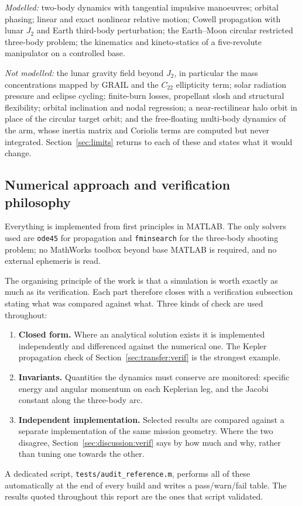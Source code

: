 \emph{Modelled:} two-body dynamics with tangential impulsive manoeuvres; orbital
phasing; linear and exact nonlinear relative motion; Cowell propagation with
lunar $J_2$ and Earth third-body perturbation; the Earth--Moon circular
restricted three-body problem; the kinematics and kineto-statics of a
five-revolute manipulator on a controlled base.

\emph{Not modelled:} the lunar gravity field beyond $J_2$, in particular the
mass concentrations mapped by GRAIL \cite{zuber_grail} and the $C_{22}$
ellipticity term; solar radiation pressure and eclipse cycling; finite-burn
losses, propellant slosh and structural flexibility; orbital inclination and
nodal regression; a near-rectilinear halo orbit in place of the circular target
orbit; and the free-floating multi-body dynamics of the arm, whose inertia
matrix and Coriolis terms are computed but never integrated. Section~\ref{sec:limits}
returns to each of these and states what it would change.

\subsection{Numerical approach and verification philosophy}

Everything is implemented from first principles in MATLAB. The only solvers used
are \texttt{ode45} for propagation and \texttt{fminsearch} for the three-body
shooting problem; no MathWorks toolbox beyond base MATLAB is required, and no
external ephemeris is read.

The organising principle of the work is that a simulation is worth exactly as
much as its verification. Each part therefore closes with a verification
subsection stating what was compared against what. Three kinds of check are used
throughout:

\begin{enumerate}[label=(\roman*)]
\item \textbf{Closed form.} Where an analytical solution exists it is
      implemented independently and differenced against the numerical one. The
      Kepler propagation check of Section~\ref{sec:transfer:verif} is the
      strongest example.
\item \textbf{Invariants.} Quantities the dynamics must conserve are monitored:
      specific energy and angular momentum on each Keplerian leg, and the Jacobi
      constant along the three-body arc.
\item \textbf{Independent implementation.} Selected results are compared against
      a separate implementation of the same mission geometry. Where the two
      disagree, Section~\ref{sec:discussion:verif} says by how much and why,
      rather than tuning one towards the other.
\end{enumerate}

A dedicated script, \texttt{tests/audit\_reference.m}, performs all of these
automatically at the end of every build and writes a pass/warn/fail table. The
results quoted throughout this report are the ones that script validated.
